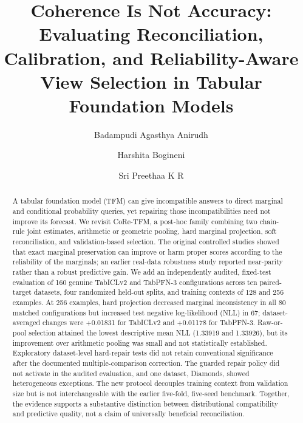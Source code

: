 \documentclass[a4paper,fleqn]{cas-sc}
\begin{document}
\title[mode=title]{Coherence Is Not Accuracy: Evaluating Reconciliation, Calibration, and Reliability-Aware View Selection in Tabular Foundation Models}

\author[vit]{Badampudi Agasthya Anirudh}
\author[vit]{Harshita Bogineni}
\author[vit]{Sri Preethaa K R}
\cormark[1]

\begin{abstract}
A tabular foundation model (TFM) can give incompatible answers to direct marginal and conditional probability queries, yet repairing those incompatibilities need not improve its forecast. We revisit CoRe-TFM, a post-hoc family combining two chain-rule joint estimates, arithmetic or geometric pooling, hard marginal projection, soft reconciliation, and validation-based selection. The original controlled studies showed that exact marginal preservation can improve or harm proper scores according to the reliability of the marginals; an earlier real-data robustness study reported near-parity rather than a robust predictive gain. We add an independently audited, fixed-test evaluation of 160 genuine TabICLv2 and TabPFN-3 configurations across ten paired-target datasets, four randomized held-out splits, and training contexts of 128 and 256 examples. At 256 examples, hard projection decreased marginal inconsistency in all 80 matched configurations but increased test negative log-likelihood (NLL) in 67; dataset-averaged changes were +0.01831 for TabICLv2 and +0.01178 for TabPFN-3. Raw-or-pool selection attained the lowest descriptive mean NLL (1.33919 and 1.33926), but its improvement over arithmetic pooling was small and not statistically established. Exploratory dataset-level hard-repair tests did not retain conventional significance after the documented multiple-comparison correction. The guarded repair policy did not activate in the audited evaluation, and one dataset, Diamonds, showed heterogeneous exceptions. The new protocol decouples training context from validation size but is not interchangeable with the earlier five-fold, five-seed benchmark. Together, the evidence supports a substantive distinction between distributional compatibility and predictive quality, not a claim of universally beneficial reconciliation.
\end{abstract}
\end{document}
